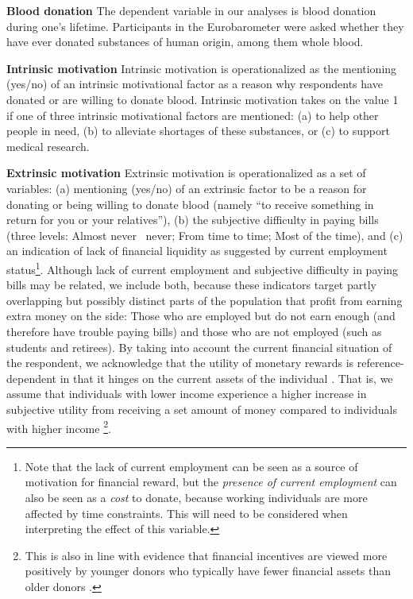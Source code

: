 \documentclass[AER]{AEA}
\begin{document}
\textbf{Blood donation} The dependent variable in our analyses is blood donation during one's lifetime. Participants in the Eurobarometer were asked whether they have ever donated substances of human origin, among them whole blood. 

\textbf{Intrinsic motivation} Intrinsic motivation is operationalized as the mentioning (yes/no) of an intrinsic motivational factor as a reason why respondents have donated or are willing to donate blood. Intrinsic motivation takes on the value 1 if one of three intrinsic motivational factors are mentioned: (a) to help other people in need, (b) to alleviate shortages of these substances, or (c) to support medical research. 

\textbf{Extrinsic motivation} Extrinsic motivation is operationalized as a set of variables: (a) mentioning (yes/no) of an extrinsic factor to be a reason for donating or being willing to donate blood (namely “to receive something in return for you or your relatives”), (b) the subjective difficulty in paying bills (three levels: Almost never \ never; From time to time; Most of the time), and (c) an indication of lack of financial liquidity as suggested by current employment status\footnote{Note that the lack of current employment can be seen as a source of motivation for financial reward, but the \textit{presence of current employment} can also be seen as a \textit{cost} to donate, because working individuals are more affected by time constraints. This will need to be considered when interpreting the effect of this variable.}. Although lack of current employment and subjective difficulty in paying bills may be related, we include both, because these indicators target partly overlapping but possibly distinct parts of the population that profit from earning extra money on the side: Those who are employed but do not earn enough (and therefore have trouble paying bills) and those who are not employed (such as students and retirees). By taking into account the current financial situation of the respondent, we acknowledge that the utility of monetary rewards is reference-dependent in that it hinges on the current assets of the individual \citep{tversky_loss_1991}. That is, we assume that individuals with lower income experience a higher increase in subjective utility from receiving a set amount of money compared to individuals with higher income \footnote{This is also in line with evidence that financial incentives are viewed more positively by younger donors who typically have fewer financial assets than older donors \citep{glynn_attitudes_2003}.}.
\end{document}
